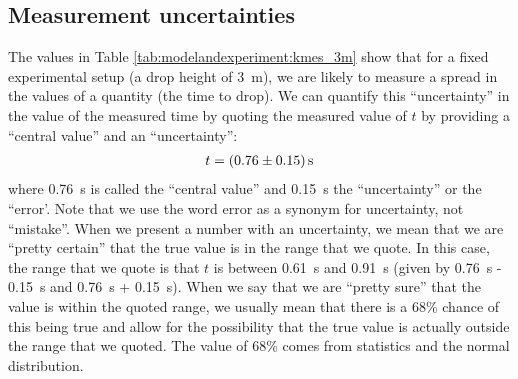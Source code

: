 \subsection{Measurement uncertainties}
The values in Table \ref{tab:modelandexperiment:kmes_3m} show that for a fixed experimental setup (a drop height of \SI{3}{m}), we are likely to measure a spread in the values of a quantity (the time to drop). We can quantify this ``uncertainty'' in the value of the measured time by quoting the measured value of $t$ by providing a ``central value'' and an ``uncertainty'':
\begin{align*}
t = \SI{0.76 \pm 0.15}{s}
\end{align*}
where \SI{0.76}{s} is called the ``central value'' and \SI{0.15}{s} the ``uncertainty'' or the ``error'. Note that we use the word error as a synonym for uncertainty, not ``mistake''. When we present a number with an uncertainty, we mean that we are ``pretty certain'' that the true value is in the range that we quote. In this case, the range that we quote is that $t$ is between \SI{0.61}{s} and \SI{0.91}{s} (given by \SI{0.76}{s} - \SI{0.15}{s} and \SI{0.76}{s} + \SI{0.15}{s}). When we say that we are ``pretty sure'' that the value is within the quoted range, we usually mean that there is a 68\% chance of this being true and allow for the possibility that the true value is actually outside the range that we quoted. The value of 68\% comes from statistics and the normal distribution. 
